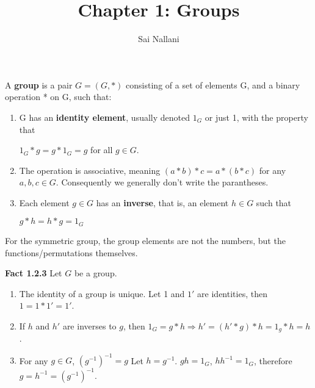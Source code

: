 \documentclass{article}
\author{Sai Nallani}
\title{Chapter 1: Groups}
\begin{document}
\maketitle
A \textbf{group} is a pair $G = (G, *)$ consisting of a set of elements G, and
a binary operation * on G, such that:
\begin{enumerate}
    \item G has an \textbf{identity element}, usually denoted $1_G$ or just
          1, with the property that
          \begin{center}
              $1_G * g = g * 1_G = g$ for all $g \in G$.
          \end{center}
    \item The operation is associative, meaning $(a * b) * c = a * (b * c)$
          for any $a, b, c \in G$. Consequently we generally don't write the
          parantheses.
    \item Each element $g \in G$ has an \textbf{inverse}, that is, an element
          $h \in G$ such that
          \begin{center}
              $g * h = h * g = 1_G$
          \end{center}
\end{enumerate}

For the symmetric group, the group elements are not the numbers, but the
functions/permutations themselves.

\textbf{Fact 1.2.3} Let $G$ be a group.
\begin{enumerate}
    \item The identity of a group is unique.
          Let 1 and $1'$ are identities, then $1 = 1 * 1' = 1'$.
    \item If $h$ and $h'$ are inverses to $g$, then $1_G = g * h \Rightarrow
              h' = (h' * g) * h = 1_g * h = h$.
    \item For any $g \in G$, $(g^{-1})^{-1} = g$
          Let $h = g^{-1}$. $gh = 1_G$, $hh^{-1} = 1_G$, therefore $g=h^{-1}=(g^{-1})^{-1}$.

\end{enumerate}
\end{document}
